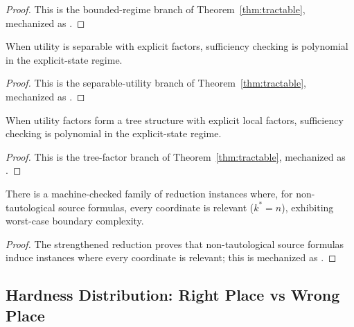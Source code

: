 \begin{proof}
This is the bounded-regime branch of Theorem~\ref{thm:tractable}, mechanized as .
\end{proof}

\begin{corollary}\label{cor:practice-structured}
When utility is separable with explicit factors, sufficiency checking is polynomial in the explicit-state regime.
\end{corollary}

\begin{proof}
This is the separable-utility branch of Theorem~\ref{thm:tractable}, mechanized as .
\end{proof}

\begin{corollary}\label{cor:practice-tree}
When utility factors form a tree structure with explicit local factors, sufficiency checking is polynomial in the explicit-state regime.
\end{corollary}

\begin{proof}
This is the tree-factor branch of Theorem~\ref{thm:tractable}, mechanized as .
\end{proof}

\begin{corollary}\label{cor:practice-unstructured}
There is a machine-checked family of reduction instances where, for non-tautological source formulas, every coordinate is relevant ($k^*=n$), exhibiting worst-case boundary complexity.
\end{corollary}

\begin{proof}
The strengthened reduction proves that non-tautological source formulas induce instances where every coordinate is relevant; this is mechanized as .
\end{proof}

\subsection{Hardness Distribution: Right Place vs Wrong Place}\label{sec:hardness-distribution}

